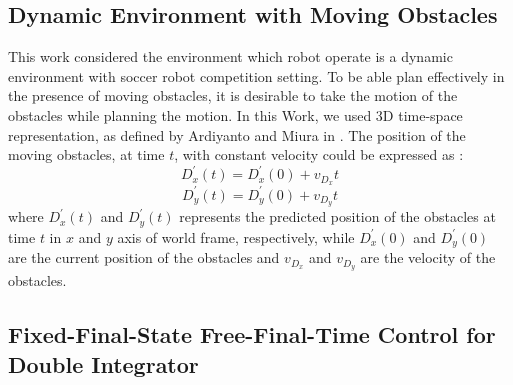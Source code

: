 \documentclass[conference]{IEEEtran}
\begin{document}
\subsection{Dynamic Environment with Moving Obstacles}

This work considered the environment which robot operate is a dynamic environment with soccer robot competition setting. To be able plan effectively in the presence of moving obstacles, it is desirable to take the motion of the obstacles while planning the motion. In this Work, we used 3D time-space representation, as defined by Ardiyanto and Miura in \cite{ardiyanto2012real}. The position of the moving obstacles, at time $t$, with constant velocity could be expressed as :
\begin{equation} \label{dynamic_obs_x}
 D^{'}_{x}(t) = D^{'}_{x}(0) + v_{D_x}t
\end{equation}
\begin{equation} \label{dynamic_obs_y}
 D^{'}_{y}(t) = D^{'}_{y}(0) + v_{D_y}t
\end{equation}
where $D^{'}_{x}(t)$ and $D^{'}_{y}(t)$ represents the predicted position of the obstacles at time $t$ in $x$ and $y$ axis of world frame, respectively, while $D^{'}_{x}(0)$ and $D^{'}_{y}(0)$ are the current position of the obstacles and $v_{D_x}$ and $v_{D_y}$ are the velocity of the obstacles.

\subsection{Fixed-Final-State Free-Final-Time Control for Double Integrator}
\end{document}
